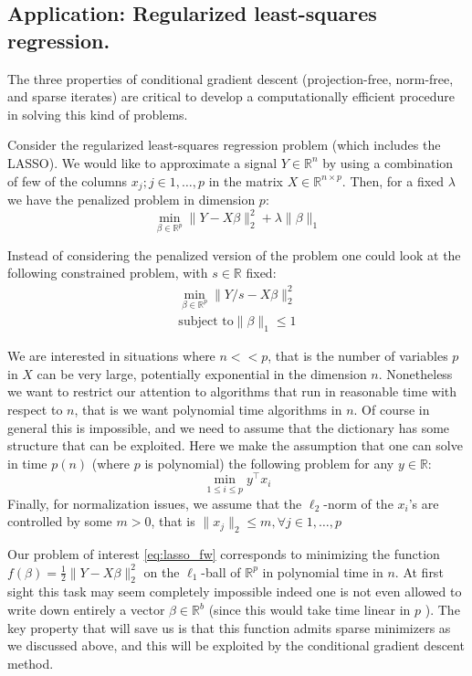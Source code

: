 \subsection{Application: Regularized least-squares regression.}
The three properties of conditional gradient descent (projection-free, norm-free, and sparse iterates) are critical to develop a computationally efficient procedure in solving this kind of problems.

Consider the regularized least-squares regression problem (which includes the LASSO). We would like to approximate a signal $Y \in \mathbb{R}^n$ by using a combination of few of the columns $x_j; j\in 1,\ldots,p$ in the matrix $X \in \mathbb{R}^{n \times p}$. Then, for a fixed $\lambda$ we have the penalized problem in dimension $p$:
\begin{equation}
\min_{\beta \in \mathbb{R}^p} \| Y - X \beta \|_2^2 + \lambda \|\beta\|_1 \nonumber
\end{equation}

Instead of considering the penalized version of the problem one could look at the following constrained problem, with $s \in \mathbb{R}$ fixed:
\begin{align} \label{eq:lasso_fw}
\min_{\beta \in \mathbb{R}^p} \| Y/s - X \beta \|_2^2 \\
\text{subject to} \|\beta\|_1 \leq 1 \nonumber
\end{align}

We are interested in situations where $n<<p$, that is the number of variables $p$ in $X$ can be very large, potentially exponential in the dimension $n$. Nonetheless we want to restrict our attention to algorithms that run in reasonable time with respect to $n$, that is we want polynomial time algorithms in $n$. Of course in general this is impossible, and we need to assume that the dictionary has some structure that can be exploited. Here we make the assumption that one can solve in time $p(n)$ (where $p$ is polynomial) the following problem for any $y\in\mathbb{R}$:
\begin{equation}
\min_{ 1\leq i \leq p } y^{\top} x_i\nonumber
\end{equation}
Finally, for normalization issues, we assume that the $\ell_2$-norm of the $x_i$'s are controlled by some $m > 0$, that is $\| x_j \|_2 \leq m, \forall j \in 1,\ldots,p $

Our problem of interest \ref{eq:lasso_fw} corresponds to minimizing the function $f(\beta) = \frac{1}{2}\| Y - X \beta \|_2^2 $ on the $\ell_1$-ball of $\mathbb{R}^p$ in polynomial time in $n$. At first sight this task may seem completely impossible indeed one is not even allowed to write down entirely a vector $\beta \in \mathbb{R}^b$ (since this would take time linear in $p$ ). The key property that will save us is that this function admits sparse minimizers as we discussed above, and this will be exploited by the conditional gradient descent method.

